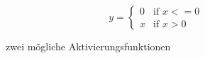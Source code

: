 \[ y = \left\{ \begin{array}{ll}
         0 & \mbox{if $x <= 0$}\\
	        x & \mbox{if $x > 0$}\end{array} \right. \] 
	        
	        
\begin{figure}%
    \centering
    \qquad
    \caption{zwei mögliche Aktivierungsfunktionen}%
    \label{Aktivierungsfunktionen}%
\end{figure}



